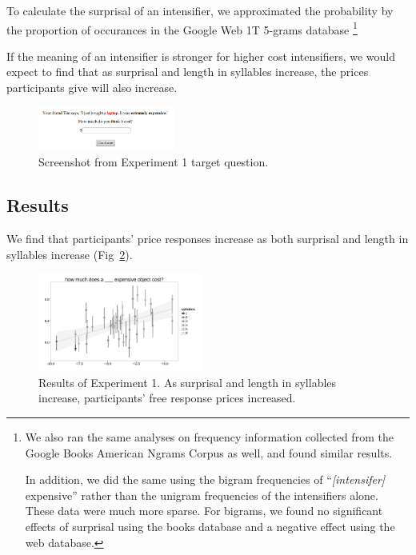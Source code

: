 \documentclass[10pt,letterpaper]{article}
\begin{document}
To calculate the surprisal of an intensifier, we approximated the probability by the proportion of occurances in the Google Web 1T 5-grams database \cite{web1t5gram}
\footnote{
We also ran the same analyses on frequency information collected from the Google Books American Ngrams Corpus \cite{books2011} as well, and found similar results.

In addition, we did the same using the bigram frequencies of ``\emph{[intensifer]} expensive'' rather than the unigram frequencies of the intensifiers alone. These data were much more sparse. For bigrams, we found no significant effects of surprisal using the books database and a negative effect using the web database.
}



If the meaning of an intensifier is stronger for higher cost intensifiers, we would expect to find that as surprisal and length in syllables increase, the prices participants give will also increase.

\begin{figure}[ht]
\begin{center}
\includegraphics[width=0.4\textwidth]{analysis_files_for_writeup/images/exp1-q.png}
\end{center}
\caption{Screenshot from Experiment 1 target question.} 
\label{exp1-q}
\end{figure}

\subsection{Results}

We find that participants' price responses increase as both surprisal and length in syllables increase (Fig~\ref{exp1-plot}).

\begin{figure}[ht]
\begin{center}
\includegraphics[width=0.48\textwidth]{analysis_files_for_writeup/images/exp1-plot.png}
\end{center}
\caption{Results of Experiment 1. As surprisal and length in syllables increase, participants' free response prices increased.} 
\label{exp1-plot}
\end{figure}
\end{document}

